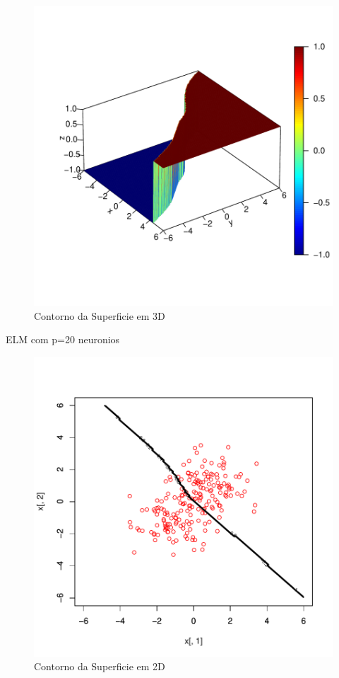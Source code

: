 \documentclass[12pt,a4paper]{article}
\begin{document}
\begin{itemize}
\begin{figure}[!htb]
\begin{center}
\includegraphics{exELM-006}
\end{center}
\caption{Contorno da Superficie em 3D}
\label{Contorno da Superficie em 3D}
\end{figure}

ELM com p=20 neuronios


\begin{figure}[!htb]
\begin{center}
\includegraphics{exELM-008}
\end{center}
\caption{Contorno da Superficie em 2D}
\label{Contorno da Superficie em 2D}
\end{figure}


\end{itemize}
\end{document}
